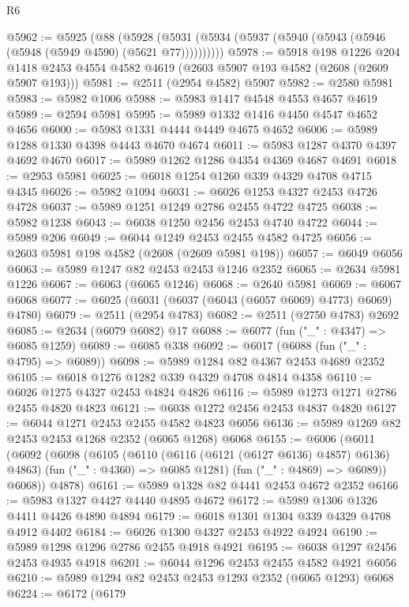 \begin{lexlean}{R6}
\begin{coremodule}
@5962 := @5925
    (@88 (@5928 (@5931 (@5934 (@5937 (@5940 (@5943 (@5946 (@5948 (@5949 @4590) (@5621 @77))))))))))
@5978 := @5918
    @198
    @1226
    @204
    @1418
    @2453
    @4554
    @4582
    @4619
    (@2603 @5907 @193 @4582 (@2608 (@2609 @5907 @193)))
@5981 := @2511 (@2954 @4582) @5907
@5982 := @2580 @5981
@5983 := @5982 @1006
@5988 := @5983 @1417 @4548 @4553 @4657 @4619
@5989 := @2594 @5981
@5995 := @5989 @1332 @1416 @4450 @4547 @4652 @4656
@6000 := @5983 @1331 @4444 @4449 @4675 @4652
@6006 := @5989 @1288 @1330 @4398 @4443 @4670 @4674
@6011 := @5983 @1287 @4370 @4397 @4692 @4670
@6017 := @5989 @1262 @1286 @4354 @4369 @4687 @4691
@6018 := @2953 @5981
@6025 := @6018 @1254 @1260 @339 @4329 @4708 @4715 @4345
@6026 := @5982 @1094
@6031 := @6026 @1253 @4327 @2453 @4726 @4728
@6037 := @5989 @1251 @1249 @2786 @2455 @4722 @4725
@6038 := @5982 @1238
@6043 := @6038 @1250 @2456 @2453 @4740 @4722
@6044 := @5989 @206
@6049 := @6044 @1249 @2453 @2455 @4582 @4725
@6056 := @2603 @5981 @198 @4582 (@2608 (@2609 @5981 @198))
@6057 := @6049 @6056
@6063 := @5989 @1247 @82 @2453 @2453 @1246 @2352
@6065 := @2634 @5981 @1226
@6067 := @6063 (@6065 @1246)
@6068 := @2640 @5981
@6069 := @6067 @6068
@6077 := @6025 (@6031 (@6037 (@6043 (@6057 @6069) @4773) @6069) @4780)
@6079 := @2511 (@2954 @4783)
@6082 := @2511 (@2750 @4783) @2692
@6085 := @2634 (@6079 @6082) @17
@6088 := @6077 (fun ("_" : @4347) => @6085 @1259)
@6089 := @6085 @338
@6092 := @6017 (@6088 (fun ("_" : @4795) => @6089))
@6098 := @5989 @1284 @82 @4367 @2453 @4689 @2352
@6105 := @6018 @1276 @1282 @339 @4329 @4708 @4814 @4358
@6110 := @6026 @1275 @4327 @2453 @4824 @4826
@6116 := @5989 @1273 @1271 @2786 @2455 @4820 @4823
@6121 := @6038 @1272 @2456 @2453 @4837 @4820
@6127 := @6044 @1271 @2453 @2455 @4582 @4823 @6056
@6136 := @5989 @1269 @82 @2453 @2453 @1268 @2352 (@6065 @1268) @6068
@6155 := @6006
    (@6011
      (@6092
        (@6098
          (@6105
            (@6110 (@6116 (@6121 (@6127 @6136) @4857) @6136) @4863)
            (fun ("_" : @4360) => @6085 @1281)
            (fun ("_" : @4869) => @6089))
          @6068))
      @4878)
@6161 := @5989 @1328 @82 @4441 @2453 @4672 @2352
@6166 := @5983 @1327 @4427 @4440 @4895 @4672
@6172 := @5989 @1306 @1326 @4411 @4426 @4890 @4894
@6179 := @6018 @1301 @1304 @339 @4329 @4708 @4912 @4402
@6184 := @6026 @1300 @4327 @2453 @4922 @4924
@6190 := @5989 @1298 @1296 @2786 @2455 @4918 @4921
@6195 := @6038 @1297 @2456 @2453 @4935 @4918
@6201 := @6044 @1296 @2453 @2455 @4582 @4921 @6056
@6210 := @5989 @1294 @82 @2453 @2453 @1293 @2352 (@6065 @1293) @6068
@6224 := @6172
    (@6179

\end{coremodule}
\end{lexlean}
